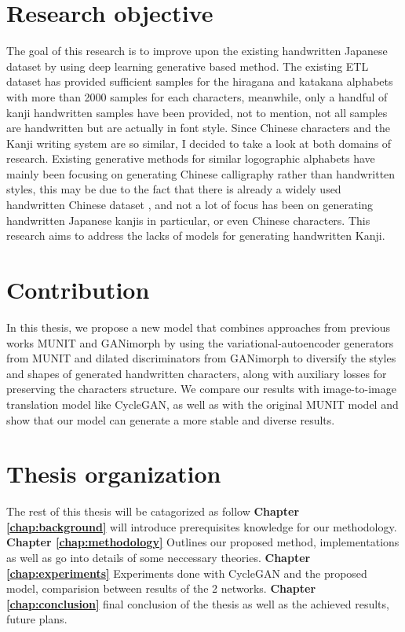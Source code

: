 \documentclass[12pt]{report}
\begin{document}
\section{Research objective}
The goal of this research is to improve upon the existing handwritten Japanese dataset by 
using deep learning generative based method.
The existing ETL dataset has provided sufficient samples for the hiragana and
katakana alphabets with more than 2000 samples for each characters, meanwhile,
only a handful of kanji handwritten samples have been provided, not to mention, not
all samples are handwritten but are actually in font style.
Since Chinese characters and the Kanji writing system are so similar, I decided to
take a look at both domains of research. Existing generative methods for similar
logographic alphabets have mainly been focusing on generating Chinese calligraphy
rather than handwritten styles, this may be due to the fact that there is already a
widely used handwritten Chinese dataset \cite{casia}, and not a lot of focus has been on
generating handwritten Japanese kanjis in particular, or even Chinese characters. This
research aims to address the lacks of models for generating handwritten Kanji.

\section{Contribution}
In this thesis, we propose a new model that combines approaches from previous works MUNIT\cite{munit} and GANimorph\cite{ganimorph} by using the variational-autoencoder generators from MUNIT and dilated discriminators from GANimorph to diversify the styles and shapes of generated handwritten characters, along with auxiliary losses for preserving the characters structure. We compare our results with image-to-image translation model like CycleGAN\cite{cycle-gan}, as well as with the original MUNIT\cite{munit} model and show that our model can generate a more stable and diverse results.

\section{Thesis organization}
The rest of this thesis will be catagorized as follow \textbf{Chapter \ref{chap:background}} will introduce prerequisites knowledge for our methodology. \textbf{Chapter \ref{chap:methodology}} Outlines our proposed method, implementations as well as go into details of some neccessary theories. \textbf{Chapter \ref{chap:experiments}} Experiments done with CycleGAN and the proposed model, comparision between results of the 2 networks. \textbf{Chapter \ref{chap:conclusion}} final conclusion of the thesis as well as the achieved results, future plans.
\end{document}
